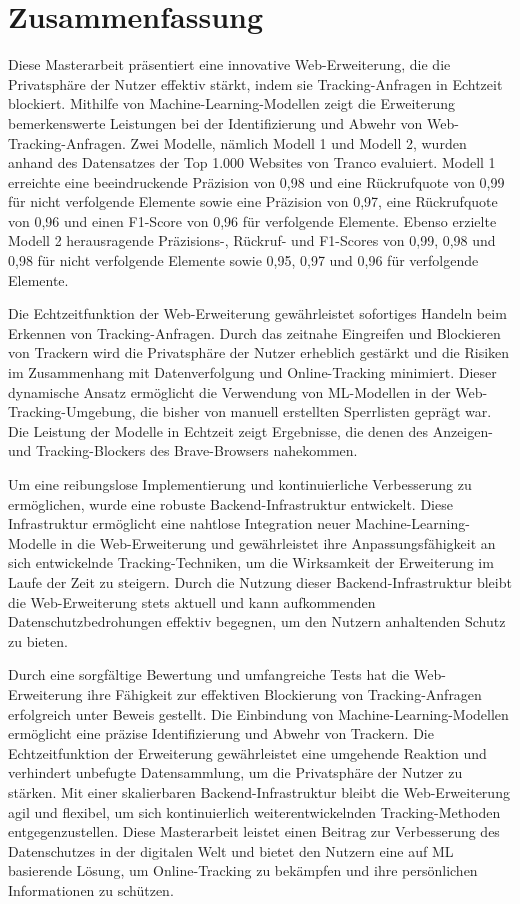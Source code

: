 \chapter*{Zusammenfassung}
\label{cha:zusammenfassung}


Diese Masterarbeit präsentiert eine innovative Web-Erweiterung, die die Privatsphäre der Nutzer effektiv stärkt,
indem sie Tracking-Anfragen in Echtzeit blockiert. Mithilfe von Machine-Learning-Modellen zeigt die Erweiterung
bemerkenswerte Leistungen bei der Identifizierung und Abwehr von Web-Tracking-Anfragen. Zwei Modelle, nämlich Modell 1
und Modell 2, wurden anhand des Datensatzes der Top 1.000 Websites von Tranco evaluiert. Modell 1 erreichte eine
beeindruckende Präzision von 0,98 und eine Rückrufquote von 0,99 für nicht verfolgende Elemente sowie eine Präzision
von 0,97, eine Rückrufquote von 0,96 und einen F1-Score von 0,96 für verfolgende Elemente. Ebenso erzielte Modell 2
herausragende Präzisions-, Rückruf- und F1-Scores von 0,99, 0,98 und 0,98 für nicht verfolgende Elemente sowie 0,95, 0,97
und 0,96 für verfolgende Elemente.

Die Echtzeitfunktion der Web-Erweiterung gewährleistet sofortiges Handeln beim Erkennen von Tracking-Anfragen. Durch
das zeitnahe Eingreifen und Blockieren von Trackern wird die Privatsphäre der Nutzer erheblich gestärkt und die Risiken
im Zusammenhang mit Datenverfolgung und Online-Tracking minimiert. Dieser dynamische Ansatz ermöglicht die Verwendung
von ML-Modellen in der Web-Tracking-Umgebung, die bisher von manuell erstellten Sperrlisten geprägt war. Die Leistung
der Modelle in Echtzeit zeigt Ergebnisse, die denen des Anzeigen- und Tracking-Blockers des Brave-Browsers nahekommen.

Um eine reibungslose Implementierung und kontinuierliche Verbesserung zu ermöglichen, wurde eine robuste Backend-Infrastruktur
entwickelt. Diese Infrastruktur ermöglicht eine nahtlose Integration neuer Machine-Learning-Modelle in die Web-Erweiterung
und gewährleistet ihre Anpassungsfähigkeit an sich entwickelnde Tracking-Techniken, um die Wirksamkeit der Erweiterung
im Laufe der Zeit zu steigern. Durch die Nutzung dieser Backend-Infrastruktur bleibt die Web-Erweiterung stets aktuell
und kann aufkommenden Datenschutzbedrohungen effektiv begegnen, um den Nutzern anhaltenden Schutz zu bieten.

Durch eine sorgfältige Bewertung und umfangreiche Tests hat die Web-Erweiterung ihre Fähigkeit zur effektiven Blockierung
von Tracking-Anfragen erfolgreich unter Beweis gestellt. Die Einbindung von Machine-Learning-Modellen ermöglicht eine
präzise Identifizierung und Abwehr von Trackern. Die Echtzeitfunktion der Erweiterung gewährleistet eine umgehende Reaktion
und verhindert unbefugte Datensammlung, um die Privatsphäre der Nutzer zu stärken. Mit einer skalierbaren Backend-Infrastruktur
bleibt die Web-Erweiterung agil und flexibel, um sich kontinuierlich weiterentwickelnden Tracking-Methoden entgegenzustellen.
Diese Masterarbeit leistet einen Beitrag zur Verbesserung des Datenschutzes in der digitalen Welt und bietet den Nutzern eine
auf ML basierende Lösung, um Online-Tracking zu bekämpfen und ihre persönlichen Informationen zu schützen.
